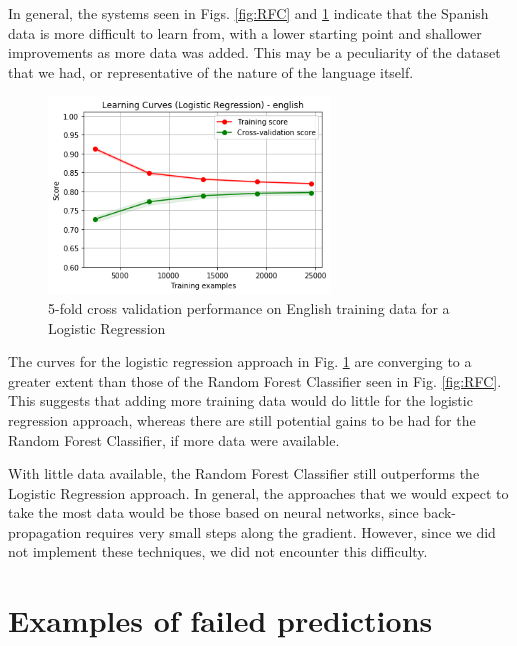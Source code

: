 \documentclass[11pt,a4paper]{article}
\begin{document}
In general, the systems seen in Figs. \ref{fig:RFC} and \ref{fig:Log} indicate that the Spanish data is more difficult to learn from, with a lower starting point and shallower improvements as more data was added. This may be a peculiarity of the dataset that we had, or representative of the nature of the language itself.

\begin{figure}[h]
\begin{minipage}[b]{1.0\linewidth}
  \centering
  \centerline{\includegraphics[width=7.5cm]{images/LogEng}}
\end{minipage}
\caption{5-fold cross validation performance on English training data for a Logistic Regression}
\label{fig:Log}
\end{figure}

The curves for the logistic regression approach in Fig. \ref{fig:Log} are converging to a greater extent than those of the Random Forest Classifier seen in Fig. \ref{fig:RFC}. This suggests that adding more training data would do little for the logistic regression approach, whereas there are still potential gains to be had for the Random Forest Classifier, if more data were available.

With little data available, the Random Forest Classifier still outperforms the Logistic Regression approach. In general, the approaches that we would expect to take the most data would be those based on neural networks, since back-propagation requires very small steps along the gradient. However, since we did not implement these techniques, we did not encounter this difficulty.



\section{Examples of failed predictions}
\end{document}
